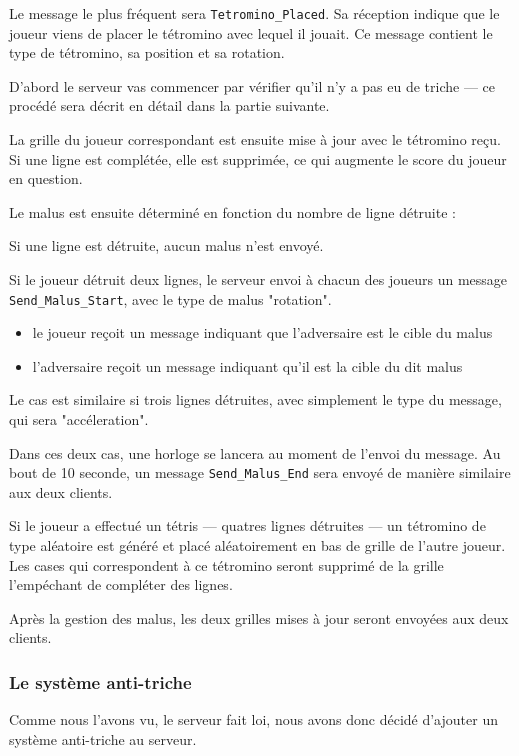 \documentclass[a4paper, 12pt]{article}
\begin{document}
 
			Le message le plus fréquent sera \texttt{Tetromino\_Placed}. Sa réception indique que le joueur viens de placer le tétromino avec lequel il jouait. Ce message contient le type de tétromino, sa position et sa rotation. 

			D'abord le serveur vas commencer par vérifier qu'il n'y a pas eu de triche --- ce procédé sera décrit en détail dans la partie suivante. 


			La grille du joueur correspondant est ensuite mise à jour avec le tétromino reçu.
			Si une ligne est complétée, elle est supprimée, ce qui augmente le score du joueur en question.


			Le malus est ensuite déterminé en fonction du nombre de ligne détruite :

			Si une ligne est détruite, aucun malus n'est envoyé.

			Si le joueur détruit deux lignes, le serveur envoi à chacun des joueurs un message \texttt{Send\_Malus\_Start}, avec le type de malus "rotation".

			\begin{itemize}
				\item le joueur reçoit un message indiquant que l'adversaire est le cible du malus
				\item l'adversaire reçoit un message indiquant qu'il est la cible du dit malus
			\end{itemize}

			Le cas est similaire si trois lignes détruites, avec simplement le type du message, qui sera "accéleration".

			Dans ces deux cas, une horloge se lancera au moment de l'envoi du message. Au bout de 10 seconde, un message \texttt{Send\_Malus\_End} sera envoyé de manière similaire aux deux clients.

			Si le joueur a effectué un tétris --- quatres lignes détruites --- un tétromino de type aléatoire est généré et placé aléatoirement en bas de grille de l'autre joueur. Les cases qui correspondent à ce tétromino seront supprimé de la grille l'empéchant de compléter des lignes.

			Après la gestion des malus, les deux grilles mises à jour seront envoyées aux deux clients.
				
		\subsubsection{Le système anti-triche}
			Comme nous l'avons vu, le serveur fait loi, nous avons donc décidé d'ajouter un système anti-triche au serveur.
\end{document}
